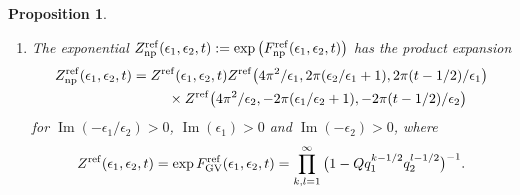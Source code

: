 \documentclass[pdftex]{sigma}
\numberwithin{equation}{section}
\newtheorem{Proposition}[Theorem]{Proposition}
 { \theoremstyle{definition}
\newtheorem{Definition}[Theorem]{Definition}
\newtheorem{Note}[Theorem]{Note}
\newtheorem{Example}[Theorem]{Example}
\newtheorem{Remark}[Theorem]{Remark} }
\begin{document}
\begin{Proposition}
\begin{enumerate}
\item[$4.$] The exponential $Z^{{\rm ref}}_{{\rm np}}(\epsilon_1,\epsilon_2,t):=\exp \big( F^{{\rm ref}}_{{\rm np}}(\epsilon_1,\epsilon_2,t)\big)$ has the product expansion
\begin{gather}
 Z^{{\rm ref}}_{{\rm np}}(\epsilon_1,\epsilon_2,t)= Z^{{\rm ref}}(\epsilon_1,\epsilon_2,t)
 Z^{{\rm ref}}\big(4\pi^2/\epsilon_1,2\pi (\epsilon_2/\epsilon_1+1),2\pi (t-1/2)/\epsilon_1\big)\nonumber\\
\hphantom{Z^{{\rm ref}}_{{\rm np}}(\epsilon_1,\epsilon_2,t)=}{}
\times Z^{{\rm ref}}\big(4\pi^2/\epsilon_2,-2\pi (\epsilon_1/\epsilon_2+1),-2\pi (t-1/2)/\epsilon_2\big)\label{prodrefnp}
\end{gather}
for $\operatorname{Im}(-\epsilon_1/\epsilon_2)>0$, $\operatorname{Im}(\epsilon_1)>0$ and $\operatorname{Im}(-\epsilon_2)>0$, where
\begin{gather*}
 Z^{\rm ref}( \epsilon_1,\epsilon_2,t) = \exp F_\mathrm{GV}^{\rm ref}( \epsilon_1,\epsilon_2,t) = \prod_{k,l=1}^\infty \big(1- Q q_1^{k-1/2} q_2^{l-1/2} \big)^{-1}.
\end{gather*}
\end{enumerate}
\end{Proposition}
\end{document}
